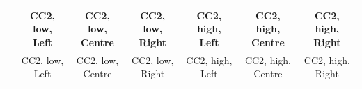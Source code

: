 
\begin{center}
\begin{small}
\begin{longtable}{l@{} c@{} c@{} c@{} c@{} c@{} c@{}}
\hline
 & \shortstack{\rule{0pt}{2.2ex}\hspace{0.25cm}CC2, low,\hspace{0.25cm}\\Left} & \shortstack{\rule{0pt}{2.2ex}\hspace{0.25cm}CC2, low,\hspace{0.25cm}\\Centre} & \shortstack{\rule{0pt}{2.2ex}\hspace{0.25cm}CC2, low,\hspace{0.25cm}\\Right} & \shortstack{\rule{0pt}{2.2ex}\hspace{0.25cm}CC2, high,\hspace{0.25cm}\\Left} & \shortstack{\rule{0pt}{2.2ex}\hspace{0.25cm}CC2, high,\hspace{0.25cm}\\Centre} & \shortstack{\rule{0pt}{2.2ex}\hspace{0.25cm}CC2, high,\hspace{0.25cm}\\Right} \\
\hline
\endfirsthead
\hline
 & \shortstack{\rule{0pt}{2.2ex}\hspace{0.25cm}CC2, low,\hspace{0.25cm}\\Left} & \shortstack{\rule{0pt}{2.2ex}\hspace{0.25cm}CC2, low,\hspace{0.25cm}\\Centre} & \shortstack{\rule{0pt}{2.2ex}\hspace{0.25cm}CC2, low,\hspace{0.25cm}\\Right} & \shortstack{\rule{0pt}{2.2ex}\hspace{0.25cm}CC2, high,\hspace{0.25cm}\\Left} & \shortstack{\rule{0pt}{2.2ex}\hspace{0.25cm}CC2, high,\hspace{0.25cm}\\Centre} & \shortstack{\rule{0pt}{2.2ex}\hspace{0.25cm}CC2, high,\hspace{0.25cm}\\Right} \\

\end{longtable}
\end{small}
\end{center}
